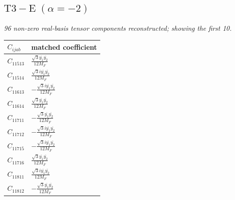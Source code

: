 \documentclass[9pt]{article}
\begin{document}
\subsection*{$ \mathrm{T3-E}\;(\alpha=-2) $}
\textit{96 non-zero real-basis tensor components reconstructed; showing the first 10.}
\begin{longtable}{@{}ll@{}}
\toprule
$C_{ijab}$ & matched coefficient \\
\midrule
$C_{11513}$ & $ \frac{\sqrt{3} \overline{y_{1}} \overline{y_{2}}}{12 M_F} $ \\
$C_{11514}$ & $ \frac{\sqrt{3} i \overline{y_{1}} \overline{y_{2}}}{12 M_F} $ \\
$C_{11613}$ & $ - \frac{\sqrt{3} i \overline{y_{1}} \overline{y_{2}}}{12 M_F} $ \\
$C_{11614}$ & $ \frac{\sqrt{3} \overline{y_{1}} \overline{y_{2}}}{12 M_F} $ \\
$C_{11711}$ & $ - \frac{\sqrt{3} \overline{y_{1}} \overline{y_{2}}}{12 M_F} $ \\
$C_{11712}$ & $ - \frac{\sqrt{3} i \overline{y_{1}} \overline{y_{2}}}{12 M_F} $ \\
$C_{11715}$ & $ - \frac{\sqrt{3} i \overline{y_{1}} \overline{y_{2}}}{12 M_F} $ \\
$C_{11716}$ & $ \frac{\sqrt{3} \overline{y_{1}} \overline{y_{2}}}{12 M_F} $ \\
$C_{11811}$ & $ \frac{\sqrt{3} i \overline{y_{1}} \overline{y_{2}}}{12 M_F} $ \\
$C_{11812}$ & $ - \frac{\sqrt{3} \overline{y_{1}} \overline{y_{2}}}{12 M_F} $ \\
\bottomrule
\end{longtable}
\end{document}
